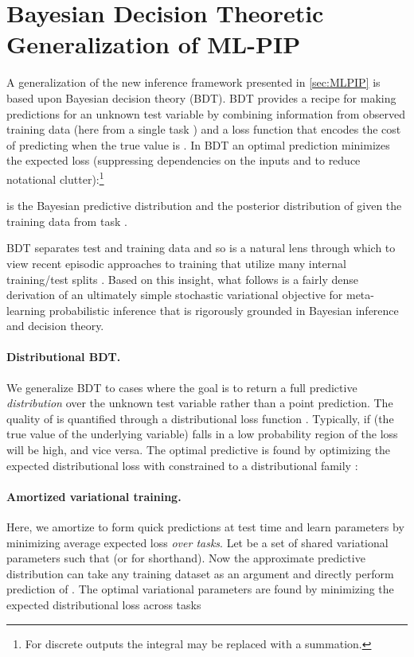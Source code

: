 \documentclass{article}
\begin{document}
\setcounter{figure}{0}
\setcounter{table}{0}
\setcounter{equation}{0}


\section{Bayesian Decision Theoretic Generalization of ML-PIP}
\label{app:bdt_derivation}

A generalization of the new inference framework presented in \cref{sec:MLPIP} is based upon Bayesian decision theory (BDT). BDT provides a recipe for making predictions  for an unknown test variable  by combining information from observed training data  (here from a single task ) and a loss function  that encodes the cost of predicting  when the true value is  \citep{berger2013statistical,jaynes2003probability}. In BDT an optimal prediction minimizes the expected loss (suppressing dependencies on the inputs and  to reduce notational clutter):\footnote{For discrete outputs the integral may be replaced with a summation.}

is the Bayesian predictive distribution and  the posterior distribution of  given the training data from task . 

BDT separates test and training data and so is a natural lens through which to view recent episodic approaches to training that utilize many internal training/test splits \citep{vinyals2016matching}. Based on this insight, what follows is a fairly dense derivation of an ultimately simple stochastic variational objective for meta-learning probabilistic inference that is rigorously grounded in Bayesian inference and decision theory.

\paragraph{Distributional BDT.} We generalize BDT to cases where the goal is to return a full predictive \emph{distribution}  over the unknown test variable  rather than a point prediction. 
The quality of  is quantified through a distributional loss function . Typically, if  (the true value of the underlying variable) falls in a low probability region of  the loss will be high, and vice versa. 
The optimal predictive  is found by optimizing the expected distributional loss with  constrained to a  distributional family :

\paragraph{Amortized variational training.} 
Here, we amortize  to form quick predictions at test time and learn parameters by minimizing average expected loss \emph{over tasks}. Let  be a set of shared variational parameters such that  (or  for shorthand). Now the approximate predictive distribution can take any training dataset  as an argument and directly perform prediction of . The optimal variational parameters are found by minimizing the expected distributional loss across tasks
\end{document}
